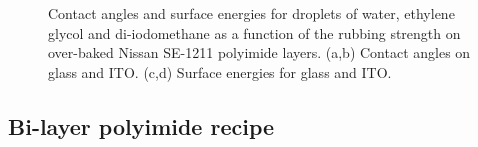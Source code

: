 \begin{figure}
\begin{center}
\end{center}
\caption[Contact angles and surface energies]{\label{fig:contact_angles/energies}Contact angles and surface energies for droplets of water, ethylene glycol and di-iodomethane as a function of the rubbing strength on over-baked Nissan SE-1211 polyimide layers. (a,b) Contact angles on glass and ITO. (c,d) Surface energies for glass and ITO.}
\end{figure}

\subsection{Bi-layer polyimide recipe}
\label{sec:double_layer}

